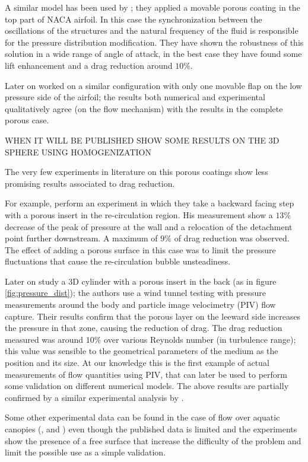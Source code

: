 A similar model has been used by \citet{venkataraman2012numerical}; they applied a movable porous coating in the top part of NACA airfoil.
In this case the synchronization between the oscillations of the structures and the natural frequency of the fluid is responsible for the pressure distribution modification.
They have shown the robustness of this solution in a wide range of angle of attack, in the best case they have found some lift enhancement and a drag reduction around $10\%$.

Later on \citet{rosti2017pelskin} worked on a similar configuration with only one movable flap on the low pressure side of the airfoil; the results both numerical and experimental qualitatively agree (on the flow mechanism) with the results in the complete porous case.

WHEN IT WILL BE PUBLISHED SHOW SOME RESULTS ON THE 3D SPHERE USING HOMOGENIZATION \citet{zampogna2017new}

The very few experiments in literature on this porous coatings show less promising results associated to drag reduction.

For example, \citet{heenan1998passive} perform an experiment in which they take a backward facing step with a porous insert in the re-circulation region.
His measurement show a $13\%$ decrease of the peak of pressure at the wall and a relocation of the detachment point further downstream.
A maximum of $9\%$ of drag reduction was observed.
The effect of adding a porous surface in this case was to limit the pressure fluctuations that cause the re-circulation bubble unsteadiness.

Later on \citet{klausmann2017drag} study a 3D cylinder with a porous insert in the back (as in figure \ref{fig:pressure_dist}); the authors use a wind tunnel testing with pressure measurements around the body and particle image velocimetry (PIV) flow capture.
Their results confirm that the porous layer on the leeward side increases the pressure in that zone, causing the reduction of drag.
The drag reduction measured was around $10\%$ over various Reynolds number (in turbulence range); this value was sensible to the geometrical parameters of the medium as the position and its size.
At our knowledge this is the first example of actual measurements of flow quantities using PIV, that can later be used to perform some validation on different numerical models.
The above results are partially confirmed by a similar experimental analysis by \citet{grizzetti2015esperimenti}.

Some other experimental data can be found in the case of flow over aquatic canopies (\citet{zhang2011exchange}, \citet{segalini2011experimental} and \citet{hamed2017impact}) even though the published data is limited and the experiments show the presence of a free surface that increase the difficulty of the problem and limit the possible use as a simple validation.

